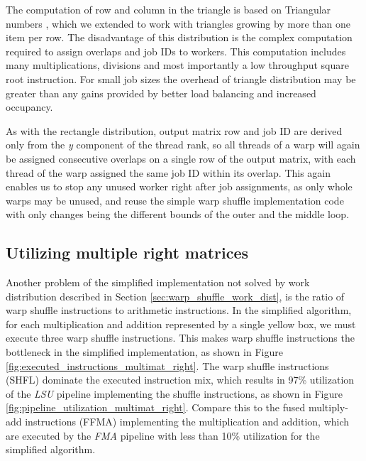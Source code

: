 The computation of row and column in the triangle is based on Triangular numbers \citep{wiki:triangular_numbers}, which we extended to work with triangles growing by more than one item per row. The disadvantage of this distribution is the complex computation required to assign overlaps and job IDs to workers. This computation includes many multiplications, divisions and most importantly a low throughput square root instruction. For small job sizes the overhead of triangle distribution may be greater than any gains provided by better load balancing and increased occupancy. 

As with the rectangle distribution, output matrix row and job ID are derived only from the \textit{y} component of the thread rank, so all threads of a warp will again be assigned consecutive overlaps on a single row of the output matrix, with each thread of the warp assigned the same job ID within its overlap. This again enables us to stop any unused worker right after job assignments, as only whole warps may be unused, and reuse the simple warp shuffle implementation code with only changes being the different bounds of the outer and the middle loop.


\subsection{Utilizing multiple right matrices}
\label{sec:multimat_right}

Another problem of the simplified implementation not solved by work distribution described in Section \ref{sec:warp_shuffle_work_dist}, is the ratio of warp shuffle instructions to arithmetic instructions. In the simplified algorithm, for each multiplication and addition represented by a single yellow box, we must execute three warp shuffle instructions. This makes warp shuffle instructions the bottleneck in the simplified implementation, as shown in Figure \ref{fig:executed_instructions_multimat_right}. The warp shuffle instructions (SHFL) dominate the executed instruction mix, which results in 97\% utilization of the \textit{LSU} pipeline implementing the shuffle instructions, as shown in Figure \ref{fig:pipeline_utilization_multimat_right}. Compare this to the fused multiply-add instructions (FFMA) implementing the multiplication and addition, which are executed by the \textit{FMA} pipeline with less than 10\% utilization for the simplified algorithm.


